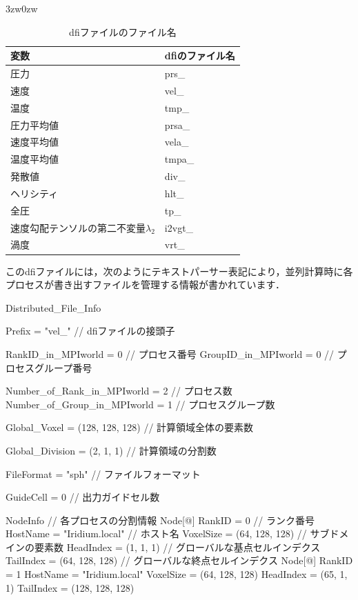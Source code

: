 \begin{indentation}{3zw}{0zw}
\begin{table}[htdp]
\caption{dfiファイルのファイル名}
\begin{center}
\small
\begin{tabular}{ll} \toprule
変数 & dfiのファイル名 \\ \midrule
圧力 & prs\_\\
速度 & vel\_\\
温度 & tmp\_\\
圧力平均値 & prsa\_\\
速度平均値 & vela\_\\
温度平均値 & tmpa\_\\
発散値 & div\_\\
ヘリシティ & hlt\_\\
全圧 & tp\_\\
速度勾配テンソルの第二不変量$\lambda_2$ & i2vgt\_\\
渦度 & vrt\_\\ \bottomrule
\end{tabular}
\end{center}
\label{tbl:dfi}
\end{table}

このdfiファイルには，次のようにテキストパーサー表記により，並列計算時に各プロセスが書き出すファイルを管理する情報が書かれています．

{\small
\begin{program}
Distributed_File_Info {

  Prefix = "vel_"                 // dfiファイルの接頭子

  RankID_in_MPIworld  = 0         // プロセス番号
  GroupID_in_MPIworld = 0         // プロセスグループ番号

  Number_of_Rank_in_MPIworld  = 2 // プロセス数
  Number_of_Group_in_MPIworld = 1 // プロセスグループ数

  Global_Voxel = (128, 128, 128)  // 計算領域全体の要素数

  Global_Division = (2, 1, 1)     // 計算領域の分割数

  FileFormat = "sph"              // ファイルフォーマット

  GuideCell = 0                   // 出力ガイドセル数

  NodeInfo {                      // 各プロセスの分割情報
    Node[@] {
      RankID    = 0               // ランク番号
      HostName  = "Iridium.local" // ホスト名
      VoxelSize = (64, 128, 128)  // サブドメインの要素数
      HeadIndex = (1, 1, 1)       // グローバルな基点セルインデクス
      TailIndex = (64, 128, 128)  // グローバルな終点セルインデクス
    }
    Node[@] {
      RankID    = 1
      HostName  = "Iridium.local"
      VoxelSize = (64, 128, 128)
      HeadIndex = (65, 1, 1)
      TailIndex = (128, 128, 128)
    }
  }

}
\end{program}}
\end{indentation}
